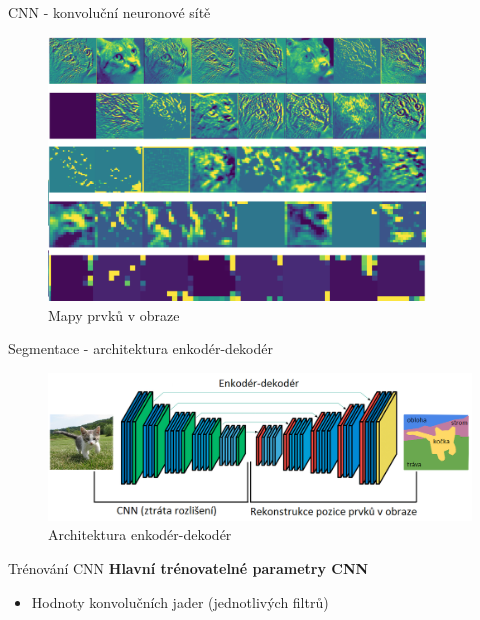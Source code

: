 \documentclass[aspectratio=1610]{beamer}
\begin{document}
\begin{frame}{CNN - konvoluční neuronové sítě}
\begin{figure}[h]
	\begin{center}
		\includegraphics[width=10cm, keepaspectratio]{maps.png}
	\end{center}
	\caption{Mapy prvků v obraze} 	
\end{figure}
\end{frame}
\begin{frame}{Segmentace - architektura enkodér-dekodér}
\begin{figure}[h]
	\begin{center}
		\includegraphics[width=15cm, keepaspectratio]{segnet.png}
	\end{center}
	\caption{Architektura enkodér-dekodér} 	
\end{figure}
\end{frame}
\begin{frame}{Trénování CNN}
\textbf{Hlavní trénovatelné parametry CNN}

\begin{itemize}
	\item Hodnoty konvolučních jader (jednotlivých filtrů)
	\vspace{5mm}		
	\begin{center}		
	\end{center}	
\end{itemize}

\end{frame}
\end{document}
